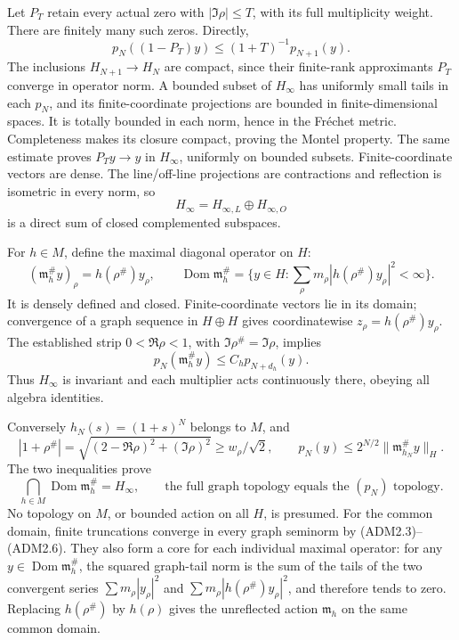Let \(P_T\) retain every actual zero with \(|\Im\rho|\le T\), with its
full multiplicity weight. There are finitely many such zeros. Directly,
\[
p_N((1-P_T)y)\le(1+T)^{-1}p_{N+1}(y).
\tag{ADM2.3}
\] The inclusions \(H_{N+1}\to H_N\) are compact, since their
finite-rank approximants \(P_T\) converge in operator norm. A bounded
subset of \(H_\infty\) has uniformly small tails in each \(p_N\), and
its finite-coordinate projections are bounded in finite-dimensional
spaces. It is totally bounded in each norm, hence in the Fréchet metric.
Completeness makes its closure compact, proving the Montel property. The
same estimate proves \(P_Ty\to y\) in \(H_\infty\), uniformly on bounded
subsets. Finite-coordinate vectors are dense. The line/off-line
projections are contractions and reflection is isometric in every norm,
so \[
H_\infty=H_{\infty,L}\oplus H_{\infty,O}
\tag{ADM2.4}
\] is a direct sum of closed complemented subspaces.

For \(h\in M\), define the maximal diagonal operator on \(H\): \[
(\mathfrak m_h^\#y)_\rho=h(\rho^\#)y_\rho,\qquad
\operatorname{Dom}\mathfrak m_h^\#
=\{y\in H:\sum_\rho m_\rho|h(\rho^\#)y_\rho|^2<\infty\}.
\tag{ADM2.5}
\] It is densely defined and closed. Finite-coordinate vectors lie in
its domain; convergence of a graph sequence in \(H\oplus H\) gives
coordinatewise \(z_\rho=h(\rho^\#)y_\rho\). The established strip
\(0<\Re\rho<1\), with \(\Im\rho^\#=\Im\rho\), implies \[
p_N(\mathfrak m_h^\#y)\le C_h p_{N+d_h}(y).
\tag{ADM2.6}
\] Thus \(H_\infty\) is invariant and each multiplier acts continuously
there, obeying all algebra identities.

Conversely \(h_N(s)=(1+s)^N\) belongs to \(M\), and \[
|1+\rho^\#|=\sqrt{(2-\Re\rho)^2+(\Im\rho)^2}
\ge w_\rho/\sqrt2,\qquad
p_N(y)\le2^{N/2}\|\mathfrak m_{h_N}^\#y\|_H.
\tag{ADM2.7}
\] The two inequalities prove \[
\boxed{\ \bigcap_{h\in M}\operatorname{Dom}\mathfrak m_h^\#
=H_\infty,\qquad
\text{the full graph topology equals the }(p_N)\text{ topology}.\ }
\tag{ADM2.8}
\] No topology on \(M\), or bounded action on all \(H\), is presumed.
For the common domain, finite truncations converge in every graph
seminorm by (ADM2.3)--(ADM2.6). They also form a core for each
individual maximal operator: for any
\(y\in\operatorname{Dom}\mathfrak m_h^\#\), the squared graph-tail norm
is the sum of the tails of the two convergent series
\(\sum m_\rho|y_\rho|^2\) and \(\sum m_\rho|h(\rho^\#)y_\rho|^2\), and
therefore tends to zero. Replacing \(h(\rho^\#)\) by \(h(\rho)\) gives
the unreflected action \(\mathfrak m_h\) on the same common domain.

